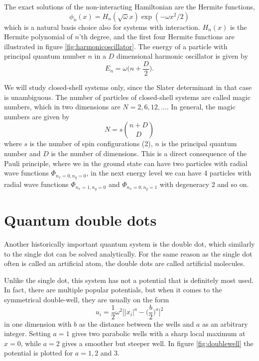 The exact solutions of the non-interacting Hamiltonian are the Hermite functions, 
\begin{equation}
\phi_n(x)=H_n(\sqrt{\omega}x)\exp(-\omega x^2/2)
\end{equation}
which is a natural basis choice also for systems with interaction. $H_n(x)$ is the Hermite polynomial of $n$'th degree, and the first four Hermite functions are illustrated in figure \eqref{fig:harmonicoscillator}. The energy of a particle with principal quantum number $n$ in a $D$ dimensional harmonic oscillator is given by
\begin{equation}
E_n=\omega\Big(n+\frac{D}{2}\Big).
\label{eq:HOenergies}
\end{equation}

We will study closed-shell systems only, since the Slater determinant in that case is unambiguous. \iffalse For open shells, the total Slater determinant is a linear combination of all the possible Slater determinants, and one can for instance use . \fi The number of particles of closed-shell systems are called magic numbers, which in two dimensions are $N=2,6,12,\hdots$. In general, the magic numbers are given by
\begin{equation}
N=s\binom{n+D}{D}
\label{eq:HOclosedshell}
\end{equation}
where $s$ is the number of spin configurations (2), $n$ is the principal quantum number and $D$ is the number of dimensions. This is a direct consequence of the Pauli principle, where we in the ground state can have two particles with radial wave functions $\Phi_{n_x=0,n_y=0}$, in the next energy level we can have 4 particles with radial wave functions $\Phi_{n_x=1,n_y=0}$ and $\Phi_{n_x=0,n_y=1}$ with degeneracy 2 and so on. 


%

\section{Quantum double dots}
Another historically important quantum system is the double dot, which similarly to the single dot can be solved analytically. For the same reason as the single dot often is called an artificial atom, the double dots are called artificial molecules. 

Unlike the single dot, this system has not a potential that is definitely most used. In fact, there are multiple popular potentials, but when it comes to the symmetrical double-well, they are usually on the form 
\begin{equation}
u_i=\frac{1}{2}\omega^2\bigg[|x_i|^a-\Big(\frac{b}{2}\Big)^a\bigg]^2
\label{eq:doublewell}
\end{equation}
in one dimension with $b$ as the distance between the wells and $a$ as an arbitrary integer. \cite{jelic_double_2012} Setting $a=1$ gives two parabolic wells with a sharp local maximum at $x=0$, while $a=2$ gives a smoother but steeper well. In figure \eqref{fig:doublewell} the potential is plotted for $a=1,2$ and $3$.

